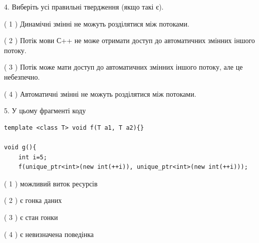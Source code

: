 \documentclass[12pt, ukrainian]{article}
\begin{document}
\begin {large}
{%
4. Виберіть усі правильні твердження (якщо такі є).\par
\vspace{2mm}

( 1 ) Динамічні змінні не можуть розділятися між потоками.%

( 2 ) Потік мови С++ не може отримати доступ до автоматичних змінних іншого потоку.%

( 3 ) Потік може мати доступ до автоматичних змінних іншого потоку, але це небезпечно.%

( 4 ) Автоматичні змінні не можуть розділятися між потоками.%


5. У цьому фрагменті коду
\begin{verbatim}
template <class T> void f(T a1, T a2){}

void g(){
    int i=5;
    f(unique_ptr<int>(new int(++i)), unique_ptr<int>(new int(++i)));
\end{verbatim}

( 1 ) можливий виток ресурсів%

( 2 ) є гонка даних%

( 3 ) є стан гонки%

( 4 ) є невизначена поведінка%
}
\end {large}
\end{document}

